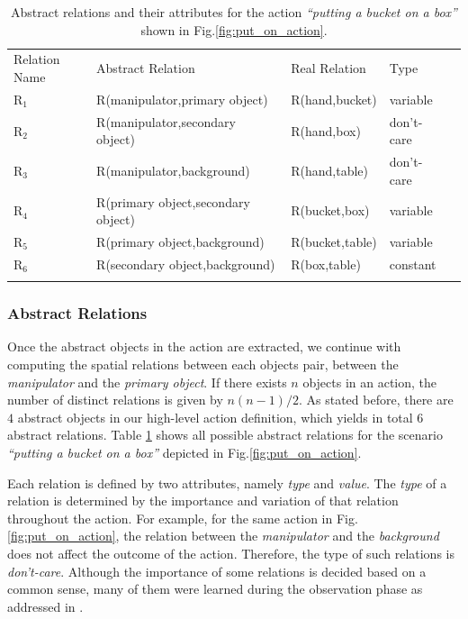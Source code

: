 \begin{table}[!hb]
\centering
\caption{Abstract relations and their attributes for the action {\it ``putting a bucket on a box''} shown in Fig.\ref{fig:put_on_action}.}
\begin{tabular}{ lllll }
\hline\noalign{\smallskip}
Relation Name & Abstract Relation & Real Relation & Type \\
\noalign{\smallskip}\hline\noalign{\smallskip}
$\text{R}_1$  & R(manipulator,primary object) & R(hand,bucket) & variable \\
$\text{R}_2$  & R(manipulator,secondary object)& R(hand,box) & don't-care \\
$\text{R}_3$  & R(manipulator,background) & R(hand,table) & don't-care \\
$\text{R}_4$  & R(primary object,secondary object) & R(bucket,box) & variable  \\
$\text{R}_5$  & R(primary object,background) & R(bucket,table) & variable \\
$\text{R}_6$  & R(secondary object,background)& R(box,table) & constant \\
\noalign{\smallskip}\hline
\end{tabular}
\label{tab:relations}
\end{table}



\subsubsection{Abstract Relations}

Once the abstract objects in the action are extracted, we continue with computing the spatial relations between each objects pair, \eg between the {\it manipulator} and the {\it primary object}.
If there exists $n$ objects in an action, the number of distinct relations is given by  $n(n-1)/2$.
As stated before, there are $4$ abstract objects in our high-level action definition, which yields in total 6 abstract relations. Table \ref{tab:relations} shows all possible abstract relations for the scenario {\it ``putting a bucket on a box''} depicted in Fig.\ref{fig:put_on_action}.


Each relation is defined by two attributes, namely 	\emph{type} and \emph{value}.
The \emph{type} of a relation is determined by the importance and variation of that relation throughout the action.
For example, for the same action in Fig.\ref{fig:put_on_action}, the relation between the {\it manipulator} and the {\it background} does not affect the outcome of the action. Therefore, the type of such relations is \emph{don't-care}. Although the importance of some relations is decided based on a common sense, many of them were learned during the observation phase as addressed in \citep{AksoyRAS2014}.

